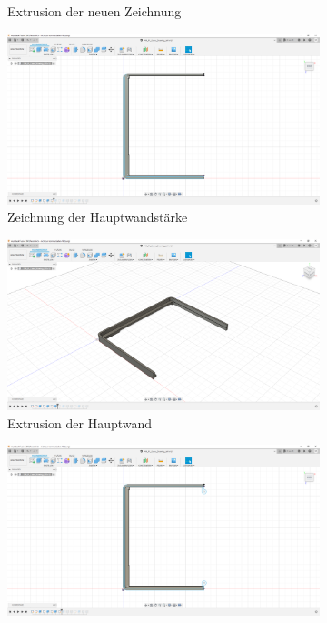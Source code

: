 \begin{figure}[h!tb]
\begin{subfigure}[t]{.3\linewidth}
		\caption[Extrusion der neuen Zeichnung]{Extrusion der neuen Zeichnung}
		\label{fig:design-left-03}
	\end{subfigure}
	\begin{subfigure}[t]{.3\linewidth}
		\includegraphics[width=\linewidth]{img/konstruktion_gehaeuse_links_004.png}
		\caption[Zeichnung der Hauptwandstärke]{Zeichnung der Hauptwandstärke}
		\label{fig:design-left-04}
	\end{subfigure}
	\begin{subfigure}[t]{.3\linewidth}
		\includegraphics[width=\linewidth]{img/konstruktion_gehaeuse_links_005.png}
		\caption[Extrusion der Hauptwand]{Extrusion der Hauptwand}
		\label{fig:design-left-05}
	\end{subfigure}
	\begin{subfigure}[t]{.3\linewidth}
		\includegraphics[width=\linewidth]{img/konstruktion_gehaeuse_links_006.png}

\end{subfigure}
\end{figure}
